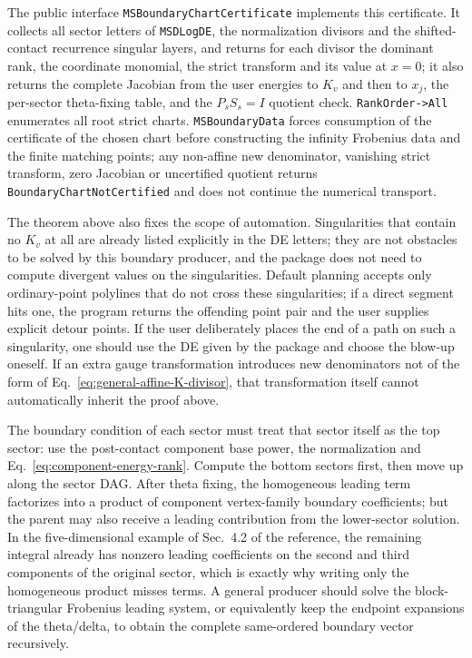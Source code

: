 \documentclass[11pt,a4paper]{article}
\begin{document}
The public interface \texttt{MSBoundaryChartCertificate} implements this certificate. It collects all sector letters of \texttt{MSDLogDE}, the normalization divisors and the shifted-contact recurrence singular layers, and returns for each divisor the dominant rank, the coordinate monomial, the strict transform and its value at $x=0$; it also returns the complete Jacobian from the user energies to $K_v$ and then to $x_j$, the per-sector theta-fixing table, and the $P_sS_s=I$ quotient check. \texttt{RankOrder->All} enumerates all root strict charts. \texttt{MSBoundaryData} forces consumption of the certificate of the chosen chart before constructing the infinity Frobenius data and the finite matching points; any non-affine new denominator, vanishing strict transform, zero Jacobian or uncertified quotient returns \texttt{BoundaryChartNotCertified} and does not continue the numerical transport.

The theorem above also fixes the scope of automation. Singularities that contain no $K_v$ at all are already listed explicitly in the DE letters; they are not obstacles to be solved by this boundary producer, and the package does not need to compute divergent values on the singularities. Default planning accepts only ordinary-point polylines that do not cross these singularities; if a direct segment hits one, the program returns the offending point pair and the user supplies explicit detour points. If the user deliberately places the end of a path on such a singularity, one should use the DE given by the package and choose the blow-up oneself. If an extra gauge transformation introduces new denominators not of the form of Eq.~\eqref{eq:general-affine-K-divisor}, that transformation itself cannot automatically inherit the proof above.

The boundary condition of each sector must treat that sector itself as the top sector: use the post-contact component base power, the normalization and Eq.~\eqref{eq:component-energy-rank}. Compute the bottom sectors first, then move up along the sector DAG. After theta fixing, the homogeneous leading term factorizes into a product of component vertex-family boundary coefficients; but the parent may also receive a leading contribution from the lower-sector solution. In the five-dimensional example of Sec.~4.2 of the reference, the remaining integral already has nonzero leading coefficients on the second and third components of the original sector, which is exactly why writing only the homogeneous product misses terms. A general producer should solve the block-triangular Frobenius leading system, or equivalently keep the endpoint expansions of the theta/delta, to obtain the complete same-ordered boundary vector recursively.
\end{document}
